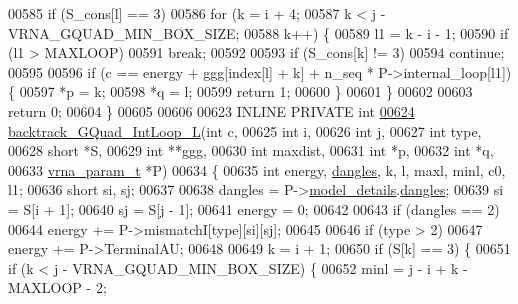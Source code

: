 \begin{DoxyCode}
00585   \textcolor{keywordflow}{if} (S\_cons[l] == 3)
00586     \textcolor{keywordflow}{for} (k = i + 4;
00587          k < j - VRNA\_GQUAD\_MIN\_BOX\_SIZE;
00588          k++) \{
00589       l1 = k - i - 1;
00590       \textcolor{keywordflow}{if} (l1 > MAXLOOP)
00591         \textcolor{keywordflow}{break};
00592 
00593       \textcolor{keywordflow}{if} (S\_cons[k] != 3)
00594         \textcolor{keywordflow}{continue};
00595 
00596       \textcolor{keywordflow}{if} (c == energy + ggg[index[l] + k] + n\_seq * P->internal\_loop[l1]) \{
00597         *p  = k;
00598         *q  = l;
00599         \textcolor{keywordflow}{return} 1;
00600       \}
00601     \}
00602 
00603   \textcolor{keywordflow}{return} 0;
00604 \}
00605 
00606 
00623 INLINE PRIVATE \textcolor{keywordtype}{int}
\hyperlink{group__gquads_ga7b371308fa5a45c7ac353ef6ed1014de}{00624} \hyperlink{group__gquads_ga7b371308fa5a45c7ac353ef6ed1014de}{backtrack\_GQuad\_IntLoop\_L}(\textcolor{keywordtype}{int}           c,
00625                           \textcolor{keywordtype}{int}           i,
00626                           \textcolor{keywordtype}{int}           j,
00627                           \textcolor{keywordtype}{int}           type,
00628                           \textcolor{keywordtype}{short}         *S,
00629                           \textcolor{keywordtype}{int}           **ggg,
00630                           \textcolor{keywordtype}{int}           maxdist,
00631                           \textcolor{keywordtype}{int}           *p,
00632                           \textcolor{keywordtype}{int}           *q,
00633                           \hyperlink{group__energy__parameters_structvrna__param__s}{vrna\_param\_t}  *P)
00634 \{
00635   \textcolor{keywordtype}{int}   energy, \hyperlink{group__model__details_ga72b511ed1201f7e23ec437e468790d74}{dangles}, k, l, maxl, minl, c0, l1;
00636   \textcolor{keywordtype}{short} si, sj;
00637 
00638   dangles = P->\hyperlink{group__energy__parameters_a7b84353eb9075c595bad4ceb871bcae7}{model\_details}.\hyperlink{group__model__details_adcda4ff2ea77748ae0e8700288282efc}{dangles};
00639   si      = S[i + 1];
00640   sj      = S[j - 1];
00641   energy  = 0;
00642 
00643   \textcolor{keywordflow}{if} (dangles == 2)
00644     energy += P->mismatchI[type][si][sj];
00645 
00646   \textcolor{keywordflow}{if} (type > 2)
00647     energy += P->TerminalAU;
00648 
00649   k = i + 1;
00650   \textcolor{keywordflow}{if} (S[k] == 3) \{
00651     \textcolor{keywordflow}{if} (k < j - VRNA\_GQUAD\_MIN\_BOX\_SIZE) \{
00652       minl  = j - i + k - MAXLOOP - 2;

\end{DoxyCode}
